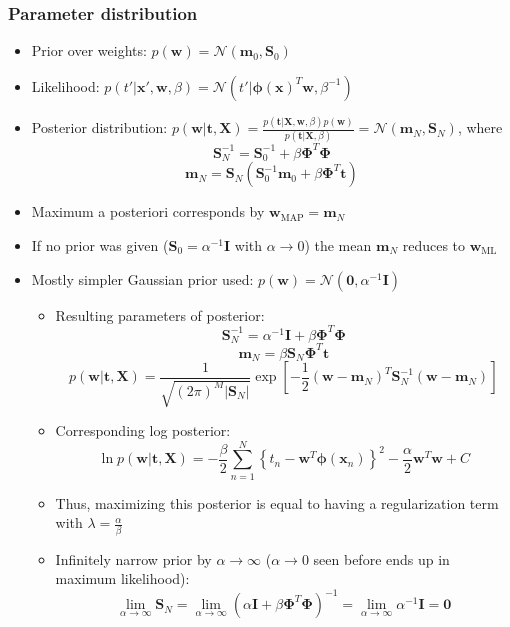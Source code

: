 \subsubsection{Parameter distribution}
\begin{itemize}
	\item Prior over weights: $p(\bm{w}) = \mathcal{N}\left(\bm{m}_0, \bm{S}_0\right)$
	\item Likelihood: $p\left(t'|\bm{x}', \bm{w}, \beta\right)=\mathcal{N}\left(t'|\bm{\phi}(\bm{x})^T\bm{w}, \beta^{-1}\right)$
	\item Posterior distribution: $p(\bm{w}|\bm{t}, \bm{X}) = \frac{p\left(\bm{t}|\bm{X}, \bm{w}, \beta\right) p\left(\bm{w}\right)}{p\left(\bm{t}|\bm{X}, \beta\right)} = \mathcal{N}\left(\bm{m}_N, \bm{S}_N\right)$, where\\
	$$\bm{S}_N^{-1}=\bm{S}_0^{-1} + \beta \bm{\Phi}^T\bm{\Phi}$$
	$$\bm{m}_N = \bm{S}_N\left(\bm{S}_0^{-1}\bm{m}_0+\beta\bm{\Phi}^T\bm{t}\right)$$
	\item Maximum a posteriori corresponds by $\bm{w}_{\text{MAP}} = \bm{m}_N$
	\item If no prior was given ($\bm{S}_0=\alpha^{-1} \bm{I}$ with $\alpha\to0$) the mean $\bm{m}_N$ reduces to $\bm{w}_{\text{ML}}$
	\item Mostly simpler Gaussian prior used: $p(\bm{w}) = \mathcal{N}\left(\bm{0}, \alpha^{-1}\bm{I}\right)$
	\begin{itemize}
		\item Resulting parameters of posterior: 
		$$\bm{S}_N^{-1}=\alpha^{-1}\bm{I} + \beta \bm{\Phi}^T\bm{\Phi}$$
		$$\bm{m}_N = \beta \bm{S}_N\bm{\Phi}^T\bm{t}$$
		$$p(\bm{w}|\bm{t}, \bm{X})=\frac{1}{\sqrt{\left(2\pi\right)^M |\bm{S}_N|}}\exp\left[-\frac{1}{2}\left(\bm{w}-\bm{m}_N\right)^T \bm{S}_N^{-1} \left(\bm{w}-\bm{m}_N\right)\right]$$
		\item Corresponding log posterior: 
		$$\ln p\left(\bm{w}|\bm{t}, \bm{X}\right) = -\frac{\beta}{2}\sum\limits_{n=1}^{N}\left\{t_n - \bm{w}^T \bm{\phi}\left(\bm{x}_n\right)\right\}^2 - \frac{\alpha}{2}\bm{w}^T \bm{w} + C$$
		\item Thus, maximizing this posterior is equal to having a regularization term with $\lambda=\frac{\alpha}{\beta}$
		\item Infinitely narrow prior by $\alpha\to\infty$ ($\alpha\to0$ seen before ends up in maximum likelihood):
		$$\lim\limits_{\alpha\to\infty} \bm{S}_N = \lim\limits_{\alpha\to\infty} \left(\alpha\bm{I}+\beta \bm{\Phi}^{T}\bm{\Phi}\right)^{-1} = \lim\limits_{\alpha\to\infty} \alpha^{-1}\bm{I} = \bm{0}$$

\end{itemize}
\end{itemize}
